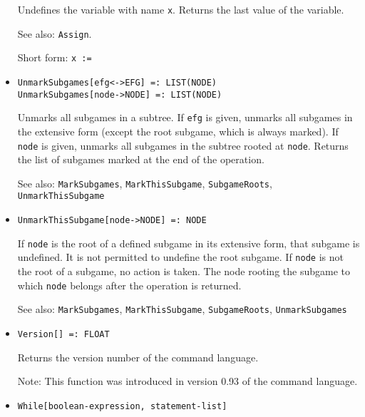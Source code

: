 \begin{itemize}
\bd
Undefines the variable with name \verb+x+.  Returns the
last value of the variable.
\item
[See also:] {\tt Assign}.
\item
[Short form:] \verb+x :=+
\ed

\item
\protect \large \begin{verbatim}
UnmarkSubgames[efg<->EFG] =: LIST(NODE)
UnmarkSubgames[node->NODE] =: LIST(NODE)
\end{verbatim}\normalsize

\bd
Unmarks all subgames in a subtree.  If \verb+efg+ is given, unmarks all
subgames in the extensive form (except the root subgame, which is always
marked).  If \verb+node+ is given, unmarks all subgames in the subtree
rooted at \verb+node+.  Returns the list of subgames marked at the
end of the operation.
\item
[See also:] {\tt MarkSubgames}, {\tt MarkThisSubgame}, {\tt SubgameRoots},
{\tt UnmarkThisSubgame}
\ed

\item
\protect \large \begin{verbatim}
UnmarkThisSubgame[node->NODE] =: NODE
\end{verbatim}\normalsize

\bd
If \verb+node+ is the root of a defined subgame in its extensive form,
that subgame is undefined.  It is not permitted to undefine the root
subgame.  If \verb+node+ is not the root of a subgame, no action is
taken.  The node rooting the subgame to which \verb+node+ belongs after
the operation is returned.
\item
[See also:] {\tt MarkSubgames}, {\tt MarkThisSubgame}, {\tt SubgameRoots},
{\tt UnmarkSubgames}
\ed


\item
\protect \large \begin{verbatim}
Version[] =: FLOAT
\end{verbatim} \normalsize

\bd
Returns the version number of the command language.
\item
[Note:] This function was introduced in version 0.93 of the command language.
\ed


\item 
\protect \large \begin{verbatim}
While[boolean-expression, statement-list]
\end{verbatim} \normalsize
  

\end{itemize}
